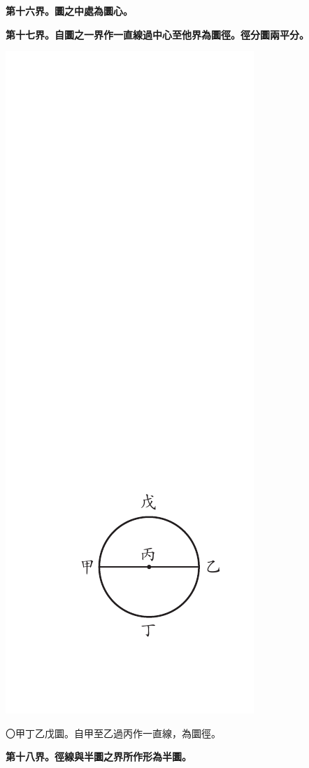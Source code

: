 \documentclass[12pt,b5paper,landscape]{article}
\newcommand{\bcom}[1]{〇#1}
\newcommand{\cthm}[1]{{
\vspace{8pt}

\bfseries #1}}
\begin{document}
\begin{multicols}{2}
\cthm{第十六界。圜之中處為圜心。}

\cthm{第十七界。自圜之一界作一直線過中心至他界為圜徑。徑分圜兩平分。}
\begin{center}
\includegraphics[angle=90]{eu13}
\end{center}
\bcom{甲丁乙戊圜。自甲至乙過丙作一直線，為圜徑。}

\cthm{第十八界。徑線與半圜之界所作形為半圜。}


\end{multicols}
\end{document}
